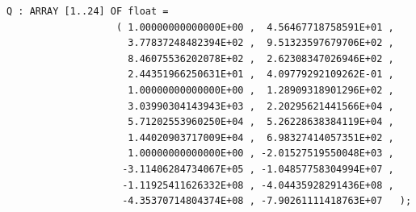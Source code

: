 \begin{refsection}
\begin{lstlisting}[caption=\textgamma distribution]
     Q : ARRAY [1..24] OF float =
                   ( 1.00000000000000E+00 ,  4.56467718758591E+01 ,
                     3.77837248482394E+02 ,  9.51323597679706E+02 ,
                     8.46075536202078E+02 ,  2.62308347026946E+02 ,
                     2.44351966250631E+01 ,  4.09779292109262E-01 ,
                     1.00000000000000E+00 ,  1.28909318901296E+02 ,
                     3.03990304143943E+03 ,  2.20295621441566E+04 ,
                     5.71202553960250E+04 ,  5.26228638384119E+04 ,
                     1.44020903717009E+04 ,  6.98327414057351E+02 ,
                     1.00000000000000E+00 , -2.01527519550048E+03 ,
                    -3.11406284734067E+05 , -1.04857758304994E+07 ,
                    -1.11925411626332E+08 , -4.04435928291436E+08 ,
                    -4.35370714804374E+08 , -7.90261111418763E+07   );


\end{lstlisting}
\end{refsection}

